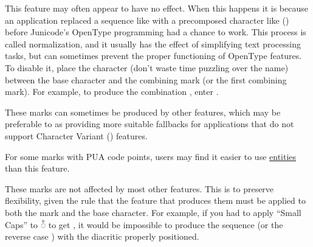 This feature may often appear to have no effect. When this happens it is because
an application replaced a sequence like  with a precomposed character
like  () before Junicode's OpenType programming had a chance to work.
This process is called normalization, and it usually has the effect of simplifying
text processing tasks, but can sometimes prevent the proper functioning of OpenType
features. To disable it, place the character   (don't waste time puzzling over the name) between the base
character and the combining mark (or the first combining mark). For example, to produce
the combination , enter .

These marks can sometimes be produced by other  features, which may be preferable to
 as providing more suitable fallbacks for applications that do not support Character Variant
() features.

For some marks with PUA code points, users may find it easier to use \hyperlink{ss10}{entities} than this feature.

These marks are not affected by most other features. This is to preserve flexibility, given the rule that the feature
that produces them must be applied to both the mark and the base character. For example, if you had to
apply  ``Small Caps'' to  ◌͏ᷨ to get
 , it would be impossible to produce the sequence
(or the reverse case )
with the diacritic properly positioned.

